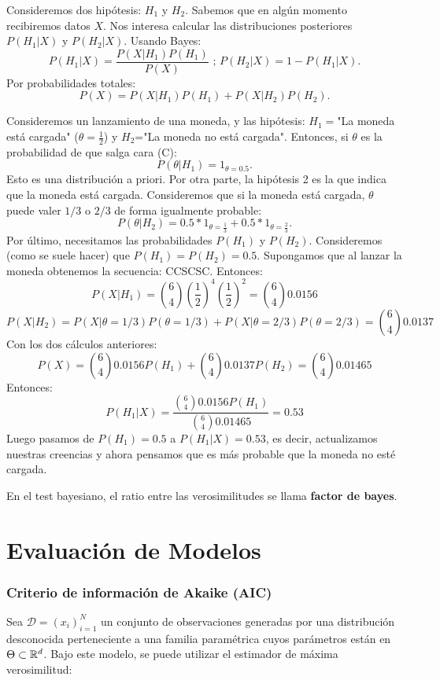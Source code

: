  Consideremos dos hipótesis: $H_1$ y $H_2$. Sabemos que en algún momento recibiremos datos $X$. Nos interesa calcular las distribuciones posteriores $P(H_1|X)$ y $P(H_2|X)$. Usando Bayes: 
 $$
 P(H_1|X)=\dfrac{P(X|H_1)P(H_1)}{P(X)} \text{ ; } 
 P(H_2|X)=1-P(H_1|X).
 $$
Por probabilidades totales: 
$$
P(X)=P(X|H_1)P(H_1)+P(X|H_2)P(H_2).
$$
\begin{example}
    Consideremos un lanzamiento de una moneda, y las hipótesis: $H_1=$"La moneda está cargada" ($\theta=\frac{1}{2}$) y $H_2$="La moneda no está cargada". Entonces, si $\theta$ es la probabilidad de que salga cara (C):
    $$
    P(\theta|H_1)=1_{\theta=0.5}.
    $$
    Esto es una distribución a priori. Por otra parte, la hipótesis 2 es la que indica que la moneda está cargada. Consideremos que si la moneda está cargada, $\theta$ puede valer $1/3$ o $2/3$ de forma igualmente probable: 
     $$
    P(\theta|H_2)= 0.5 *1_{\theta=\frac{1}{3}} + 0.5* 1_{\theta=\frac{2}{3}}.
    $$
    Por último, necesitamos las probabilidades $P(H_1)$ y $P(H_2)$. Consideremos (como se suele hacer) que $P(H_1)=P(H_2)=0.5$. Supongamos que al lanzar la moneda obtenemos la secuencia: CCSCSC. Entonces: 
    $$
    P(X|H_1)=  \binom{6}{4} (\dfrac{1}{2})^{4}(\dfrac{1}{2})^{2} =  \binom{6}{4} 0.0156 
    $$
    $$
    P(X|H_2) = P(X|\theta=1/3)P(\theta=1/3)+  P(X|\theta=2/3)P(\theta=2/3) =\binom{6}{4} 0.0137 
    $$
    Con los dos cálculos anteriores: 
    $$
    P(X)= \binom{6}{4} 0.0156 P(H_1) + \binom{6}{4} 0.0137 P(H_2) = \binom{6}{4} 0.01465
    $$
    Entonces: 
    $$
    P(H_1|X)=\dfrac{ \binom{6}{4} 0.0156 P(H_1)}{\binom{6}{4} 0.01465}  = 0.53
    $$
    Luego pasamos de $P(H_1)=0.5$ a $P(H_1|X)=0.53$, es decir, actualizamos nuestras creencias y ahora pensamos que es más probable que la moneda no esté cargada.
\end{example}
 
 En el test bayesiano, el ratio entre las verosimilitudes se llama \textbf{factor de bayes}.

\section{Evaluación de Modelos}

\subsubsection{Criterio de información de Akaike (AIC)}

Sea $\mathcal{D}=(x_i)_{i=1}^N$ un conjunto de observaciones generadas por una distribución desconocida perteneciente a una familia paramétrica cuyos parámetros están en $\Theta\subset{\mathbb R}^d$. Bajo este modelo, se puede utilizar el estimador de máxima verosimilitud:

